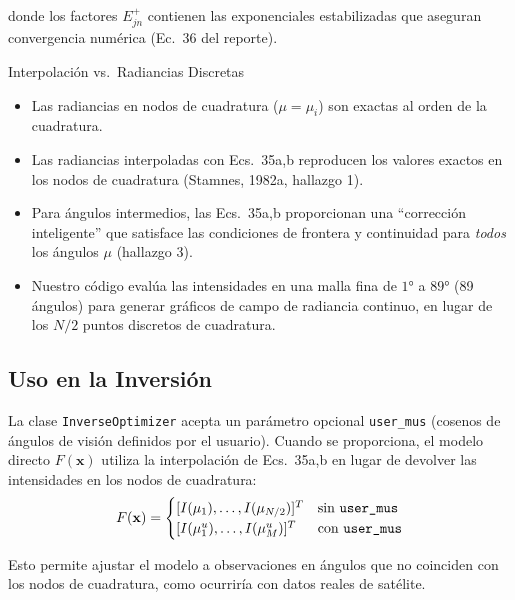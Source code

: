 \documentclass[a4paper,11pt]{article}
\begin{document}
donde los factores $E^+_{jn}$ contienen las exponenciales estabilizadas
que aseguran convergencia num\'erica (Ec.~36 del reporte).

\begin{physics}{Interpolaci\'on vs.\ Radiancias Discretas}
\begin{itemize}
    \item Las radiancias en nodos de cuadratura ($\mu = \mu_i$) son exactas
          al orden de la cuadratura.
    \item Las radiancias interpoladas con Ecs.~35a,b reproducen los valores
          exactos en los nodos de cuadratura (Stamnes, 1982a, hallazgo 1).
    \item Para \'angulos intermedios, las Ecs.~35a,b proporcionan una
          ``correcci\'on inteligente'' que satisface las condiciones de frontera
          y continuidad para \emph{todos} los \'angulos $\mu$ (hallazgo 3).
    \item Nuestro c\'odigo eval\'ua las intensidades en una malla fina de $1°$
          a $89°$ (89 \'angulos) para generar gr\'aficos de campo de radiancia
          continuo, en lugar de los $N/2$ puntos discretos de cuadratura.
\end{itemize}
\end{physics}

\subsection{Uso en la Inversi\'on}

La clase \texttt{InverseOptimizer} acepta un par\'ametro opcional
\texttt{user\_mus} (cosenos de \'angulos de visi\'on definidos por el usuario).
Cuando se proporciona, el modelo directo $F(\mathbf{x})$ utiliza la
interpolaci\'on de Ecs.~35a,b en lugar de devolver las intensidades en los
nodos de cuadratura:
\begin{equation}
    F(\mathbf{x}) = \begin{cases}
        [I(\mu_1), \ldots, I(\mu_{N/2})]^T & \text{sin \texttt{user\_mus}}\\
        [I(\mu_1^u), \ldots, I(\mu_M^u)]^T & \text{con \texttt{user\_mus}}
    \end{cases}
\end{equation}

Esto permite ajustar el modelo a observaciones en \'angulos que no coinciden
con los nodos de cuadratura, como ocurrir\'ia con datos reales de sat\'elite.


\end{document}
